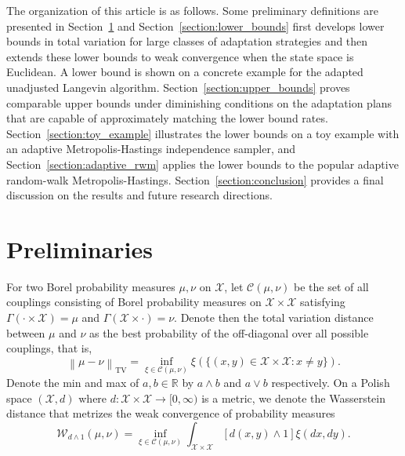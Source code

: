 \documentclass[12pt]{article}
\theoremstyle{plain}
\theoremstyle{remark}
\newcommand{\norm}[1]{\left\lVert#1\right\rVert}
\newcommand{\R}{\mathbb{R}}
\newcommand{\W}{\mathcal{W}}
\newcommand{\X}{\mathcal{X}}
\newcommand{\C}{\mathcal{C}}
\begin{document}
The organization of this article is as follows.
Some preliminary definitions are presented in Section~\ref{section:prelim} and Section~\ref{section:lower_bounds} first develops lower bounds in total variation for large classes of adaptation strategies and then extends these lower bounds to weak convergence when the state space is Euclidean.
A lower bound is shown on a concrete example for the adapted unadjusted Langevin algorithm.
Section~\ref{section:upper_bounds} proves comparable upper bounds under diminishing conditions on the adaptation plans that are capable of approximately matching the lower bound rates.
Section~\ref{section:toy_example} illustrates the lower bounds on a toy example with an adaptive Metropolis-Hastings independence sampler, and Section~\ref{section:adaptive_rwm} applies the lower bounds to the popular adaptive random-walk Metropolis-Hastings.
Section~\ref{section:conclusion} provides a final discussion on the results and future research directions.

\section{Preliminaries}
\label{section:prelim}

For two Borel probability measures $\mu, \nu$ on $\X$, let $\C(\mu, \nu)$ be the set of all couplings consisting of Borel probability measures on $\X \times \X$ satisfying $\Gamma(\cdot \times \X) = \mu$ and $\Gamma(\X \times \cdot) = \nu$. Denote then the total variation distance between $\mu$ and $\nu$ as the best probability of the off-diagonal over all possible couplings, that is,
\[
\norm{ \mu - \nu }_{\text{TV}}
= \inf_{\xi \in \C(\mu, \nu)} \xi( \{ (x, y) \in \X \times \X : x \not= y \} ).
\]
Denote the min and max of $a, b \in \R$ by $a \wedge b$ and $a \vee b$ respectively.
On a Polish space $(\X, d)$ where $d : \X \times \X \to [0, \infty)$ is a metric, we denote the Wasserstein distance that metrizes the weak convergence of probability measures \citep[Theorem 11.3.3]{dudley:2018}
\[
\W_{d \wedge 1}(\mu, \nu)
= \inf_{\xi \in \C(\mu, \nu)} \int_{\X \times \X} \left[ d(x, y) \wedge 1 \right] \xi(dx, dy).
\]
\end{document}
